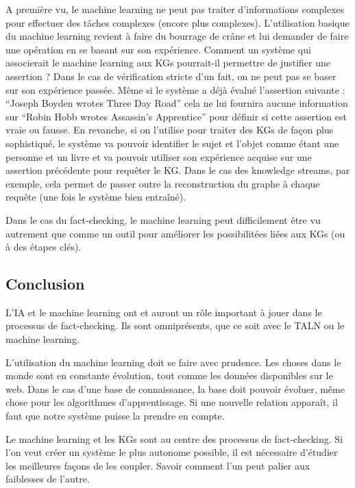 A première vu, le machine learning ne peut pas traiter d'informations complexes pour effectuer des tâches complexes (encore plus complexes). L'utilisation basique du machine learning revient à faire du bourrage de crâne et lui demander de faire une opération en se basant sur son expérience. Comment un système qui associerait le machine learning aux KGs pourrait-il permettre de justifier une assertion ? Dans le cas de vérification stricte d'un fait, on ne peut pas se baser sur son expérience passée. Même si le système a déjà évalué l'assertion suivante : \enquote{Joseph Boyden wrotes Three Day Road} cela ne lui fournira aucune information sur \enquote{Robin Hobb wrotes Assassin's Apprentice} pour définir si cette assertion est vraie ou fausse. En revanche, si on l'utilise pour traiter des KGs de façon plus sophistiqué, le système va pouvoir identifier le sujet et l'objet comme étant une personne et un livre et va pouvoir utiliser son expérience acquise sur une assertion précédente pour requêter le KG. Dans le cas des knowledge streams, par exemple, cela permet de passer outre la reconstruction du graphe à chaque requête (une fois le système bien entraîné).

Dans le cas du fact-checking, le machine learning peut difficilement être vu autrement que comme un outil pour améliorer les possibilitées liées aux KGs (ou à des étapes clés).

\subsection{Conclusion}

L'IA et le machine learning ont et auront un rôle important à jouer dans le processus de fact-checking. Ils sont omniprésents, que ce soit avec le TALN ou le machine learning. 

L'utilisation du machine learning doit se faire avec prudence. Les choses dans le monde sont en constante évolution, tout comme les données disponibles sur le web. Dans le cas d'une base de connaissance, la base doit pouvoir évoluer, même chose pour les algorithmes d'apprentissage. Si une nouvelle relation apparaît, il faut que notre système puisse la prendre en compte.

Le machine learning et les KGs sont au centre des processus de fact-checking. Si l'on veut créer un système le plus autonome possible, il est nécessaire d'étudier les meilleures façons de les coupler. Savoir comment l'un peut palier aux faiblesses de l'autre.